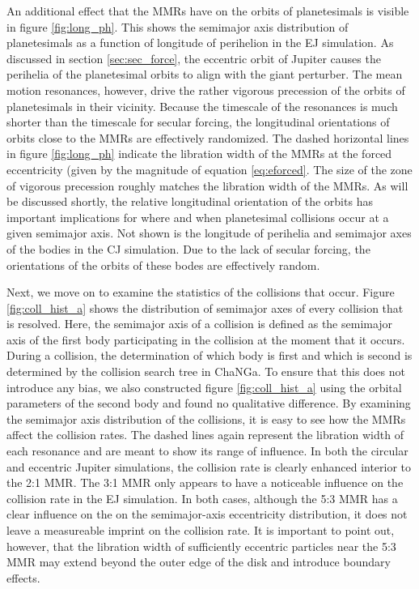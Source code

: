 \documentclass[twocolumn]{aastex63}
\begin{document}
An additional effect that the MMRs have on the orbits of planetesimals is visible in figure \ref{fig:long_ph}. This shows the semimajor 
axis distribution of planetesimals as a function of longitude of perihelion in the EJ simulation. As discussed in section 
\ref{sec:sec_force}, the eccentric orbit of Jupiter causes the perihelia of the planetesimal orbits to align with the giant perturber. The 
mean motion resonances, however, drive the rather vigorous precession of the orbits of planetesimals in their vicinity. Because the 
timescale of the resonances is much shorter than the timescale for secular forcing, the longitudinal orientations of orbits close to the 
MMRs are effectively randomized. The dashed horizontal lines in figure \ref{fig:long_ph} indicate the libration width of the MMRs at 
the forced eccentricity (given by the magnitude of equation \ref{eq:eforced}. The size of the zone of vigorous precession roughly 
matches the libration width of the MMRs. As will be discussed shortly, the relative longitudinal orientation of the orbits has important 
implications for where and when planetesimal collisions occur at a given semimajor axis. Not shown is the longitude of perihelia and 
semimajor axes of the bodies in the CJ simulation. Due to the lack of secular forcing, the orientations of the orbits of these bodes are 
effectively random.

Next, we move on to examine the statistics of the collisions that occur. Figure \ref{fig:coll_hist_a} shows the distribution of semimajor 
axes of every collision that is resolved. Here, the semimajor axis of a collision is defined as the semimajor axis of the first body 
participating in the collision at the moment that it occurs. During a collision, the determination of which body is first and which is 
second is determined by the collision search tree in {\sc ChaNGa}. To ensure that this does not introduce any bias, we also 
constructed figure \ref{fig:coll_hist_a} using the orbital parameters of the second body and found no qualitative difference. By 
examining the semimajor axis distribution of the collisions, it is easy to see how the MMRs affect the collision rates. The dashed lines 
again represent the libration width of each resonance and are meant to show its range of influence. In both the circular and eccentric 
Jupiter simulations, the collision rate is clearly enhanced interior to the 2:1 MMR. The 3:1 MMR only appears to have a noticeable 
influence on the collision rate in the EJ simulation. In both cases, although the 5:3 MMR has a clear influence on the on the 
semimajor-axis eccentricity distribution, it does not leave a measureable imprint on the collision rate. It is important to point out, 
however, that the libration width of sufficiently eccentric particles near the 5:3 MMR may extend beyond the outer edge of the disk 
and introduce boundary effects.
\end{document}
